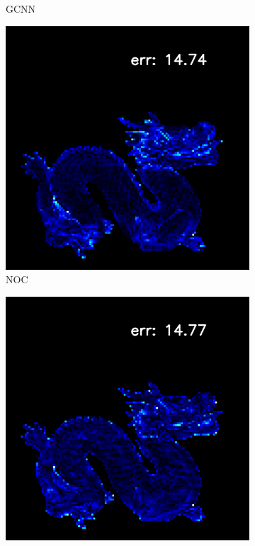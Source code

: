 \begin{figure}[H]
\begin{subfigure}[b]{0.24\linewidth}
		\caption{GCNN}
	\end{subfigure}
	\begin{subfigure}[b]{0.24\linewidth}
		\includegraphics[width=\linewidth]{./Figures/gcnn_synthetic/fancy_eval_7_error_GCNN-NOC.png}
		\caption{NOC}
	\end{subfigure}
	\begin{subfigure}[b]{0.24\linewidth}
		\includegraphics[width=\linewidth]{./Figures/gcnn_synthetic/fancy_eval_7_error_GCNN-CNN.png}

\end{subfigure}
\end{figure}
